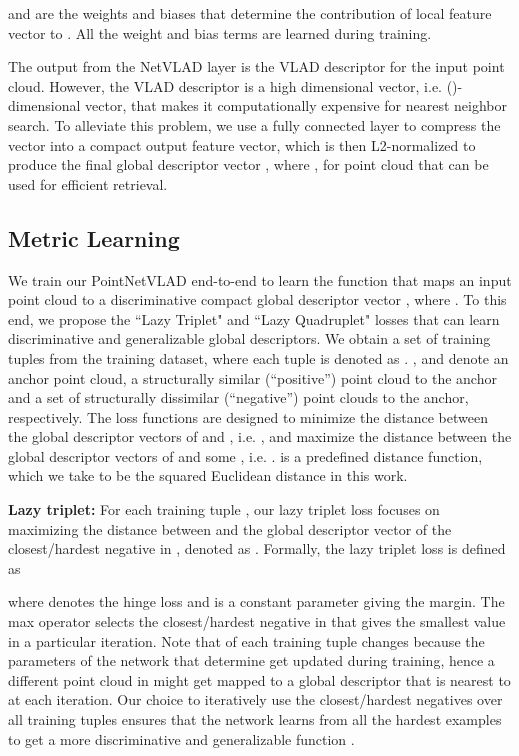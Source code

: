 \documentclass[10pt,twocolumn,letterpaper]{article}
\begin{document}
\noindent  and  are the weights and biases that determine the contribution of local feature vector  to . All the weight and bias terms are learned during training.

The output from the NetVLAD layer is the VLAD descriptor \cite{conf/cvpr/JegouDSP10,Arandjelovic:2013} for the input point cloud. However, the VLAD descriptor is a high dimensional vector, i.e. ()-dimensional vector, that makes it computationally expensive for nearest neighbor search. To alleviate this problem, 
we use a fully connected layer to compress the  vector into a compact output feature vector, which is then L2-normalized to produce the final global descriptor vector , where ,  for point cloud  that can be used for efficient retrieval. 




\subsection{Metric Learning}

We train our PointNetVLAD end-to-end to learn the function 
that maps an input point cloud  to a discriminative compact global descriptor vector , where . To this end, we 
propose the ``Lazy Triplet" and ``Lazy Quadruplet" losses that can learn discriminative and generalizable global descriptors. We obtain a set of training tuples from the training dataset, where each tuple is denoted as . ,  and  denote an anchor point cloud, a structurally similar (``positive'') point cloud to the anchor and a set of structurally dissimilar (``negative'') point clouds to the anchor, respectively. 
The loss functions are designed to 
minimize the distance between the global descriptor vectors of  and , i.e. , and maximize the distance between the global descriptor vectors of  and some , i.e. .  is a predefined distance function, which we take to be the squared Euclidean distance in this work.
\newline



\noindent \textbf{Lazy triplet:} 
For each training tuple , our lazy triplet loss focuses on maximizing the distance between  and the global descriptor vector of the
closest/hardest negative in , denoted as . Formally, the lazy triplet loss is defined as

where  denotes the hinge loss and  is a constant parameter giving the margin.   
The max operator selects the closest/hardest negative  in  that gives the smallest  value in a particular iteration. Note that  of each training tuple changes because the parameters of the network that determine  get updated during training, hence a different point cloud in  might get mapped to a global descriptor that is nearest to  at each iteration. Our choice to iteratively 
use the closest/hardest negatives over all training tuples ensures that the network learns from all the hardest examples to get a more discriminative and generalizable function .
\newline
 
\end{document}
